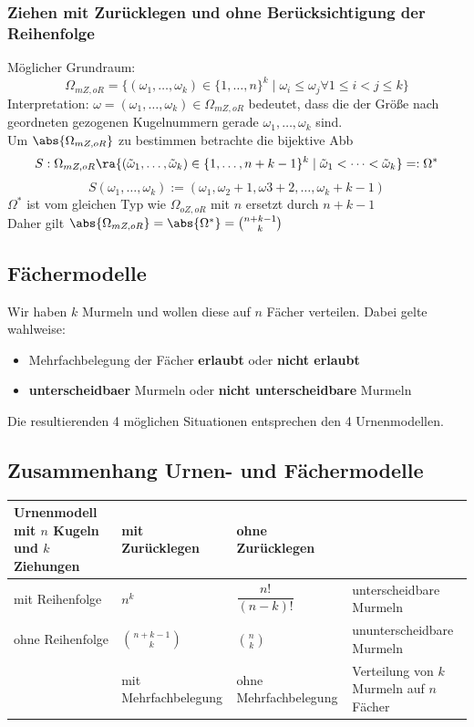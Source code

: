 \documentclass{kit}
\begin{document}
  \subsubsection{Ziehen mit Zurücklegen und ohne Berücksichtigung der Reihenfolge}
    Möglicher Grundraum:
    $$\Omega_{mZ,oR}=\{(\omega_1,\dots,\omega_k)\in\{1,\dots,n\}^k\mid\omega_i\le\omega_j\forall1\le i<j\le k\}$$
    Interpretation: $\omega=(\omega_1,\dots,\omega_k)\in\Omega_{mZ,oR}$ bedeutet, dass die der Größe nach geordneten
    gezogenen Kugelnummern gerade $\omega_1,\dots,\omega_k$ sind.\\
    Um $\abs{\Omega_{mZ,oR}}$ zu bestimmen betrachte die bijektive Abb
    $$S:\Omega_{mZ,oR}\ra\{(\tilde\omega_1,\dots,\tilde\omega_k)\in\{1,\dots,n+k-1\}^k\mid\tilde\omega_1<\dots
    <\tilde\omega_k\}=:\Omega^*$$
    $$S(\omega_1,\dots,\omega_k):=(\omega_1,\omega_2+1,\omega3+2,\dots,\omega_k+k-1)$$
    $\Omega^*$ ist vom gleichen Typ wie $\Omega_{oZ,oR}$ mit $n$ ersetzt durch $n+k-1$\\
    Daher gilt $\abs{\Omega_{mZ,oR}}=\abs{\Omega^*}=\binom{n+k-1}{k}$
  \subsection{Fächermodelle}
    Wir haben $k$ Murmeln und wollen diese auf $n$ Fächer verteilen. Dabei gelte wahlweise:
    \begin{itemize}
      \item Mehrfachbelegung der Fächer \textbf{erlaubt} oder \textbf{nicht erlaubt}
      \item \textbf{unterscheidbaer} Murmeln oder \textbf{nicht unterscheidbare} Murmeln
    \end{itemize}
    Die resultierenden 4 möglichen Situationen entsprechen den 4 Urnenmodellen.
    \newpage
  \subsection{Zusammenhang Urnen- und Fächermodelle}
    \begin{table}[h]
    \centering
    \renewcommand{\arraystretch}{1.4}
    \begin{tabularx}{\textwidth}{|Y|Y|Y|Y|}
    \hline
    Urnenmodell mit $n$ Kugeln und $k$ Ziehungen & mit Zurücklegen & ohne Zurücklegen & \\ \hline
    mit Reihenfolge & $n^k$ & $\dfrac{n!}{(n-k)!}$ & unterscheidbare Murmeln \\ \hline
    ohne Reihenfolge & $\binom{n+k-1}{k}$ & $\binom{n}{k}$ & ununterscheidbare Murmeln \\ \hline
      & mit Mehrfachbelegung & ohne Mehrfachbelegung & Verteilung von $k$ Murmeln auf $n$ Fächer \\ \hline
    \end{tabularx}
    \end{table}
\end{document}
